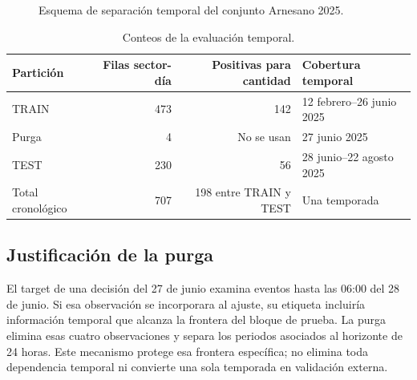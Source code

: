 \documentclass[11pt,letterpaper]{article}
\begin{document}
\begin{figure}[H]
\centering
{}
\caption{Esquema de separación temporal del conjunto Arnesano 2025.}\label{fig:split-cronologico}
\end{figure}

\begin{table}[H]
\centering
\caption{Conteos de la evaluación temporal.}\label{tab:split-detalle}
\begin{tabular}{lrrl}
\toprule
Partición & Filas sector-día & Positivas para cantidad & Cobertura temporal\\
\midrule
TRAIN & 473 & 142 & 12 febrero--26 junio 2025\\
Purga & 4 & No se usan & 27 junio 2025\\
TEST & 230 & 56 & 28 junio--22 agosto 2025\\
Total cronológico & 707 & 198 entre TRAIN y TEST & Una temporada\\
\bottomrule
\end{tabular}
\end{table}

\subsection{Justificación de la purga}
El target de una decisión del 27 de junio examina eventos hasta las 06:00 del 28 de junio. Si esa observación se incorporara al ajuste, su etiqueta incluiría información temporal que alcanza la frontera del bloque de prueba. La purga elimina esas cuatro observaciones y separa los periodos asociados al horizonte de 24 horas. Este mecanismo protege esa frontera específica; no elimina toda dependencia temporal ni convierte una sola temporada en validación externa.
\end{document}
